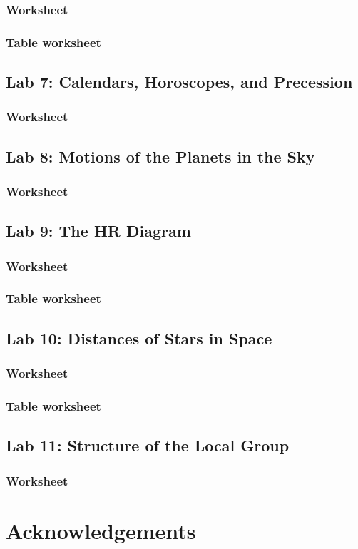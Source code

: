 \documentclass[12pt]{article}
\begin{document}
\subsubsection{Worksheet}


\subsubsection{Table worksheet}
\subsection{Lab 7: Calendars, Horoscopes, and Precession}
\subsubsection{Worksheet}
%

\subsection{Lab 8: Motions of the Planets in the Sky}
\subsubsection{Worksheet}
%

\subsection{Lab 9: The HR Diagram}
\subsubsection{Worksheet}


\subsubsection{Table worksheet}
\subsection{Lab 10: Distances of Stars in Space}
\subsubsection{Worksheet}


\subsubsection{Table worksheet}
\subsection{Lab 11: Structure of the Local Group}
\subsubsection{Worksheet}
%

\section{Acknowledgements}
\end{document}
